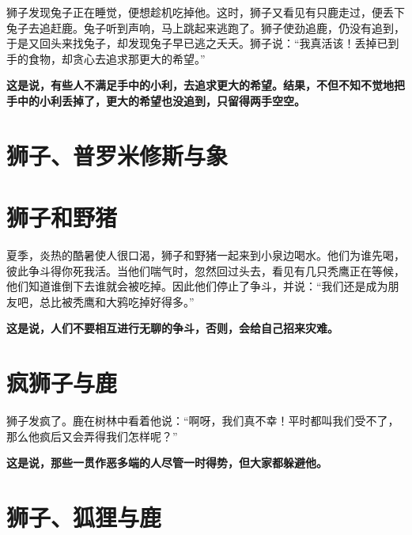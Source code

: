 狮子发现兔子正在睡觉，便想趁机吃掉他。这时，狮子又看见有只鹿走过，便丢下兔子去追赶鹿。兔子听到声响，马上跳起来逃跑了。狮子使劲追鹿，仍没有追到，于是又回头来找兔子，却发现兔子早已逃之夭夭。狮子说：“我真活该！丢掉已到手的食物，却贪心去追求那更大的希望。”

{\bfseries \color{red}这是说，有些人不满足手中的小利，去追求更大的希望。结果，不但不知不觉地把手中的小利丢掉了，更大的希望也没追到，只留得两手空空。}

\section{狮子、普罗米修斯与象}



{\bfseries \color{red}}

\section{狮子和野猪}

夏季，炎热的酷暑使人很口渴，狮子和野猪一起来到小泉边喝水。他们为谁先喝，彼此争斗得你死我活。当他们喘气时，忽然回过头去，看见有几只秃鹰正在等候，他们知道谁倒下去谁就会被吃掉。因此他们停止了争斗，并说：“我们还是成为朋友吧，总比被秃鹰和大鸦吃掉好得多。”

{\bfseries \color{red}这是说，人们不要相互进行无聊的争斗，否则，会给自己招来灾难。}

\section{疯狮子与鹿}

狮子发疯了。鹿在树林中看着他说：“啊呀，我们真不幸！平时都叫我们受不了，那么他疯后又会弄得我们怎样呢？”

{\bfseries \color{red}这是说，那些一贯作恶多端的人尽管一时得势，但大家都躲避他。}

\section{狮子、狐狸与鹿}


